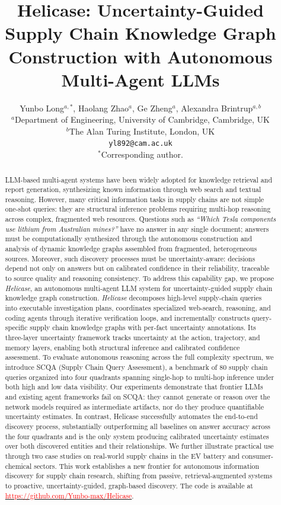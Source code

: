 \documentclass{article}
\title{Helicase: Uncertainty-Guided Supply Chain Knowledge Graph Construction with Autonomous Multi-Agent LLMs}
\author{Yunbo Long$^{a,*}$, Haolang Zhao$^{a}$, Ge Zheng$^{a}$, Alexandra Brintrup$^{a,b}$\\
$^{a}$Department of Engineering, University of Cambridge, Cambridge, UK\\
$^{b}$The Alan Turing Institute, London, UK\\
\texttt{yl892@cam.ac.uk}\\
{\small $^{*}$Corresponding author.}
}
\begin{document}
\maketitle

\begin{abstract}
LLM-based multi-agent systems have been widely adopted for knowledge retrieval and report generation, synthesizing known information through web search and textual reasoning. However, many critical information tasks in supply chains are not simple one-shot queries: they are structural inference problems requiring multi-hop reasoning across complex, fragmented web resources. Questions such as \textit{``Which Tesla components use lithium from Australian mines?''} have no answer in any single document; answers must be computationally synthesized through the autonomous construction and analysis of dynamic knowledge graphs assembled from fragmented, heterogeneous sources. Moreover, such discovery processes must be uncertainty-aware: decisions depend not only on answers but on calibrated confidence in their reliability, traceable to source quality and reasoning consistency.
To address this capability gap, we propose \textit{Helicase}, an autonomous multi-agent LLM system for uncertainty-guided supply chain knowledge graph construction. \textit{Helicase} decomposes high-level supply-chain queries into executable investigation plans, coordinates specialized web-search, reasoning, and coding agents through iterative verification loops, and incrementally constructs query-specific supply chain knowledge graphs with per-fact uncertainty annotations. Its three-layer uncertainty framework tracks uncertainty at the action, trajectory, and memory layers, enabling both structural inference and calibrated confidence assessment.
To evaluate autonomous reasoning across the full complexity spectrum, we introduce SCQA (Supply Chain Query Assessment), a benchmark of 80 supply chain queries organized into four quadrants spanning single-hop to multi-hop inference under both high and low data visibility. Our experiments demonstrate that frontier LLMs and existing agent frameworks fail on SCQA: they cannot generate or reason over the network models required as intermediate artifacts, nor do they produce quantifiable uncertainty estimates. In contrast, Helicase successfully automates the end-to-end discovery process, substantially outperforming all baselines on answer accuracy across the four quadrants and is the only system producing calibrated uncertainty estimates over both discovered entities and their relationships. We further illustrate practical use through two case studies on real-world supply chains in the EV battery and consumer-chemical sectors.
This work establishes a new frontier for autonomous information discovery for supply chain research, shifting from passive, retrieval-augmented systems to proactive, uncertainty-guided, graph-based discovery. The code is available at \href{https://github.com/Yunbo-max/Helicase}{\textcolor{red}{https://github.com/Yunbo-max/Helicase}}.
\end{abstract}
\end{document}
